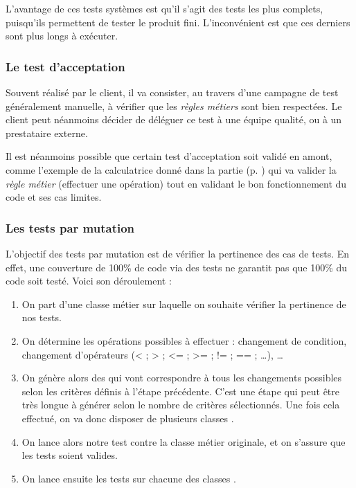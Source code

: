 L'avantage de ces tests systèmes est qu'il s'agit des tests les plus complets, puisqu'ils permettent de tester le produit fini. L'inconvénient est que ces derniers sont plus longs à exécuter.

\subsubsection{Le test d'acceptation}\label{test-acceptation}

Souvent réalisé par le client, il va consister, au travers d'une campagne de test généralement manuelle, à vérifier que les \emph{règles métiers} sont bien respectées. Le client peut néanmoins décider de déléguer ce test à une équipe qualité, ou à un prestataire externe.

Il est néanmoins possible que certain test d'acceptation soit validé en amont, comme l'exemple de la calculatrice donné dans la partie  (p. \pageref{test-composant}) qui va valider la \emph{règle métier} (effectuer une opération) tout en validant le bon fonctionnement du code et ses cas limites.

\subsubsection{Les tests par mutation}\label{ref-mutation}

L'objectif des tests par mutation est de vérifier la pertinence des cas de tests. En effet, une couverture de 100\% de code via des tests ne garantit pas que 100\% du code soit testé. Voici son déroulement : 

\begin{enumerate}
	\setlength\itemsep{0em}
	\item On part d'une classe métier sur laquelle on souhaite vérifier la pertinence de nos tests.
	\item On détermine les opérations possibles à effectuer : changement de condition, changement d'opérateurs (< ; > ; <= ; >= ; != ; == ; \ldots), \ldots
	\item On génère alors des  qui vont correspondre à tous les changements possibles selon les critères définis à l'étape précédente. C'est une étape qui peut être très longue à générer selon le nombre de critères sélectionnés. Une fois cela effectué, on va donc disposer de plusieurs classes .
	\item On lance alors notre test contre la classe métier originale, et on s'assure que les tests soient valides.
	\item On lance ensuite les tests sur chacune des classes .
\end{enumerate}

